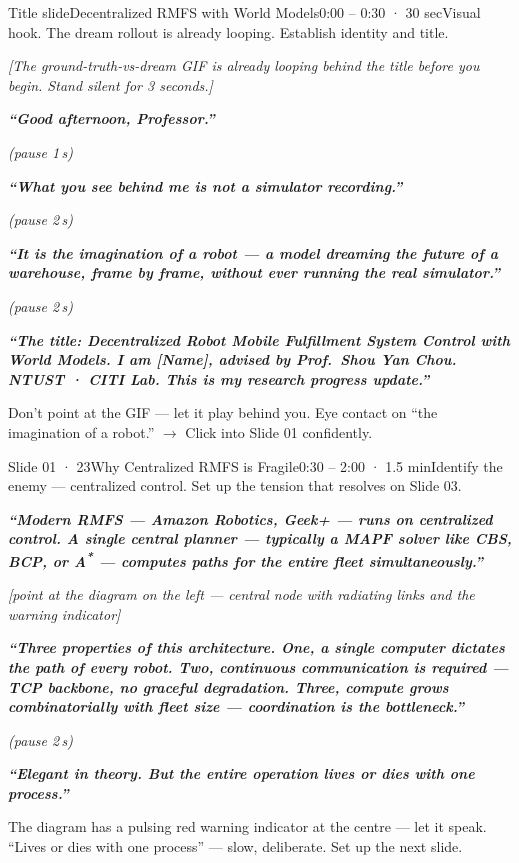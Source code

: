 \documentclass[11pt,a4paper]{article}
\newcommand{\say}[1]{%
    \par\vspace{0.3em}%
    \begingroup
    \leftskip=12pt
    \rightskip=8pt
    \color{thStrong}%
    \itshape\textbf{“#1”}%
    \par
    \endgroup
    \vspace{0.2em}
}
\newcommand{\beat}[1][2]{%
    \par\textcolor{thMuted}{\small\textit{(pause #1\,s)}}\par
    \vspace{0.2em}
}
\newcommand{\stage}[1]{%
    \par\textcolor{thMuted}{\small\textit{[#1]}}\par
    \vspace{0.2em}
}
\newcommand{\emphw}[1]{\textbf{\textcolor{thAmber}{#1}}}
\begin{document}
\begin{slide}{Title slide}{Decentralized RMFS with World Models}{0:00 – 0:30 · 30 sec}{Visual hook. The dream rollout is already looping. Establish identity and title.}
\stage{The ground-truth-vs-dream GIF is already looping behind the title before you begin. Stand silent for 3 seconds.}

\say{Good afternoon, Professor.}
\beat[1]
\say{What you see behind me is \textbf{not a simulator recording}.}
\beat
\say{It is the \emphw{imagination of a robot} — a model dreaming the future of a warehouse, frame by frame, \textbf{without ever running the real simulator}.}
\beat
\say{The title: \textbf{Decentralized Robot Mobile Fulfillment System Control with World Models}. I am [Name], advised by Prof.\ Shou Yan Chou. NTUST · CITI Lab. This is my research progress update.}

\begin{stagebox}
Don't point at the GIF — let it play behind you. Eye contact on
``the imagination of a robot.'' $\rightarrow$ Click into Slide 01 confidently.
\end{stagebox}
\end{slide}

\begin{slide}{Slide 01 · 23}{Why Centralized RMFS is Fragile}{0:30 – 2:00 · 1.5 min}{Identify the enemy — centralized control. Set up the tension that resolves on Slide 03.}
\say{Modern RMFS — Amazon Robotics, Geek+ — runs on \textbf{centralized control}. A single central planner — typically a MAPF solver like CBS, BCP, or A\textsuperscript{*} — computes paths for the entire fleet simultaneously.}

\stage{point at the diagram on the left — central node with radiating links and the warning indicator}

\say{Three properties of this architecture. \textbf{One}, a single computer dictates the path of every robot. \textbf{Two}, continuous communication is required — TCP backbone, no graceful degradation. \textbf{Three}, compute grows combinatorially with fleet size — coordination is the bottleneck.}
\beat
\say{Elegant in theory. \textbf{But the entire operation lives or dies with one process.}}

\begin{stagebox}
The diagram has a pulsing red warning indicator at the centre — let it speak. ``Lives or dies with one process'' — slow, deliberate. Set up the next slide.
\end{stagebox}
\end{slide}
\end{document}
